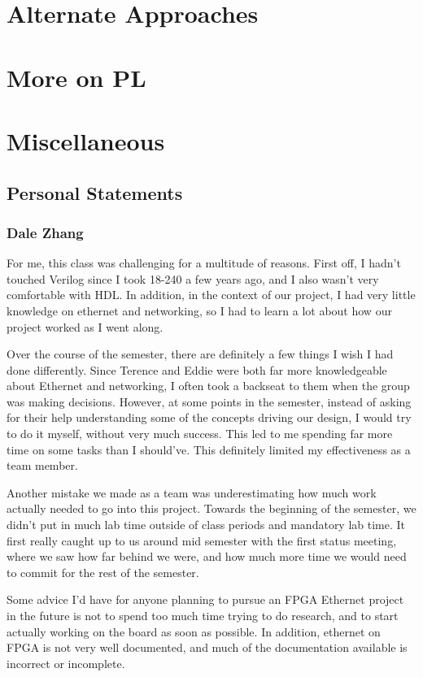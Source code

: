 \documentclass[12pt]{report}
\begin{document}
\chapter{Alternate Approaches}

\chapter{More on PL}

\chapter{Miscellaneous}
\section{Personal Statements}
\subsection{Dale Zhang}
For me, this class was challenging for a multitude of reasons. First off, I hadn't touched Verilog since I took 18-240 a few years ago, and I also wasn't very comfortable with HDL. In addition, in the context of our project, I had very little knowledge on ethernet and networking, so I had to learn a lot about how our project worked as I went along.

Over the course of the semester, there are definitely a few things I wish I had done differently. Since Terence and Eddie were both far more knowledgeable about Ethernet and networking, I often took a backseat to them when the group was making decisions. However, at some points in the semester, instead of asking for their help understanding some of the concepts driving our design, I would try to do it myself, without very much success. This led to me spending far more time on some tasks than I should've. This definitely limited my effectiveness as a team member.

Another mistake we made as a team was underestimating how much work actually needed to go into this project. Towards the beginning of the semester, we didn't put in much lab time outside of class periods and mandatory lab time. It first really caught up to us around mid semester with the first status meeting, where we saw how far behind we were, and how much more time we would need to commit for the rest of the semester.

Some advice I'd have for anyone planning to pursue an FPGA Ethernet project in the future is not to spend too much time trying to do research, and to start actually working on the board as soon as possible. In addition, ethernet on FPGA is not very well documented, and much of the documentation available is incorrect or incomplete.
\end{document}

